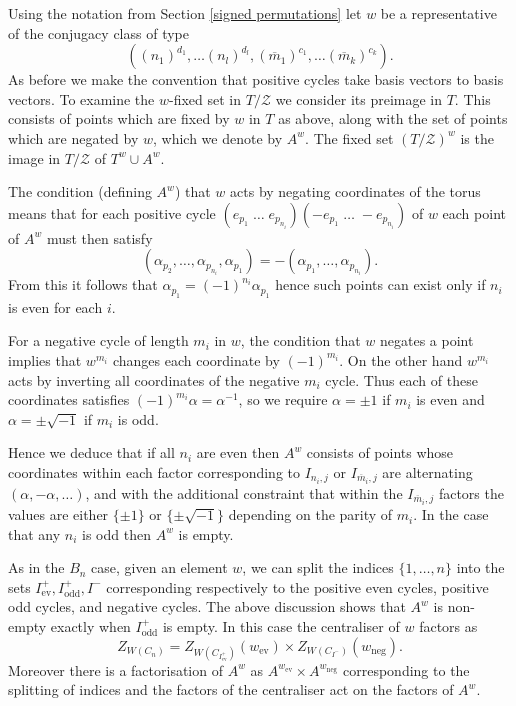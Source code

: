 \documentclass[11pt,a4paper]{article}
\def\mbar{\overline{m}}
\def\cZ{\mathcal{Z}}
\def\cZ{{\mathcal Z}}
\def\mbar{\overline{m}}
\def\ev{\mathrm{ev}}
\def\odd{\mathrm{odd}}
\def\neg{\mathrm{neg}}
\begin{document}
    
    
        
Using the notation from Section \ref{signed permutations}
let $w$ be a representative of the conjugacy class of type
    \[
((n_1)^{d_1},\dots (n_l)^{d_l},(\mbar_1)^{c_1},\dots (\mbar_k)^{c_k}).
\]
As before we make the convention that positive cycles take basis vectors to basis vectors.
To examine the $w$-fixed set in $T/\cZ$ we consider its preimage in $T$.  This consists of points which are fixed by $w$ in $T$ as above, along with the set of points which are negated by $w$, which we denote by $A^w$. The fixed set $(T/\cZ)^w$ is the image in $T/\cZ$ of $T^w\cup A^w$.


The condition (defining $A^w$) that $w$ acts by negating coordinates of the torus means that for each positive cycle $(e_{p_1}\; \dots \; e_{p_{n_i}})(-e_{p_1}\; \dots \; -e_{p_{n_i}})$ of $w$ each point of $A^w$ must then satisfy
\[
(\alpha_{p_2},\dots,\alpha_{p_{n_i}},\alpha_{p_1})=-(\alpha_{p_1},\dots,\alpha_{p_{n_i}}).
\]
From this it follows that $\alpha_{p_1}=(-1)^{n_i}\alpha_{p_1}$ hence such points can exist only if $n_i$ is even for each $i$.

For a negative cycle of length $m_i$ in $w$, the condition that $w$ negates a point implies that $w^{m_i}$ changes each coordinate by $(-1)^{m_i}$. On the other hand $w^{m_i}$ acts by inverting all coordinates of the negative $m_i$ cycle. Thus each of these coordinates satisfies $(-1)^{m_i}\alpha=\alpha^{-1}$, so we require $\alpha=\pm 1$ if $m_i$ is even and $\alpha=\pm \sqrt{-1}$ if $m_i$ is odd.

Hence we deduce that if all $n_i$ are even then $A^w$ consists of points whose coordinates within each factor corresponding to $I_{n_i,j}$ or $I_{\mbar_i,j}$ are alternating $(\alpha,-\alpha,\dots)$, and with the additional constraint that within the $I_{\mbar_i,j}$ factors the values are either $\{\pm1\}$ or $\{\pm \sqrt{-1}\}$ depending on the parity of $m_i$. In the case that any $n_i$ is odd then $A^w$ is empty.

As in the $B_n$ case, given an element $w$, we can split the indices $\{1,\dots,n\}$ into the sets $I^+_{\ev},I^+_{\odd}, I^-$ corresponding respectively to the positive even cycles, positive odd cycles, and negative cycles.  The above discussion shows that $A^w$ is non-empty exactly when $I^+_{\odd}$ is empty. In this case the centraliser of $w$ factors as
\[
Z_{W(C_n)}=Z_{W(C_{I^+_{\ev}})}(w_{\ev})\times Z_{W(C_{I^-})}(w_\neg).
\]
Moreover there is a factorisation of $A^w$ as $A^{w_\ev}\times A^{w_\neg}$ corresponding to the splitting of indices and the factors of the centraliser act on the factors of $A^w$.
\end{document}
